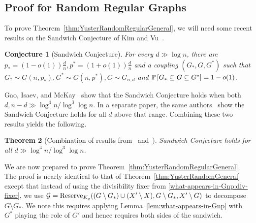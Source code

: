 \documentclass[11pt]{article}
\numberwithin{equation}{section}
\newcounter{i}
\theoremstyle{plain}
\newtheorem{thm}{Theorem}[section]
\newtheorem{conj}[thm]{Conjecture}
\theoremstyle{plain} %
\theoremstyle{definition}
\newcommand{\cG}{\mathcal{G}}
\newcommand{\Prob}[1]{\ensuremath{%
\mathbb P\left[#1\right]
}}
\begin{document}
\subsection{Proof for Random Regular Graphs}

To prove Theorem~\ref{thm:YusterRandomRegularGeneral}, we will need some recent results on the Sandwich Conjecture of Kim and Vu~\cite{KV04}.

\begin{conj}[Sandwich Conjecture]\label{conj:SandwichConj}
For every $d\gg \log n$, there are $p_{*} = (1-o(1))\frac{d}{n}, p^{*} = (1+o(1))\frac{d}{n}$ and a coupling $(G_{*},G,G^{*})$ such that $G_{*} \sim G(n,p_{*}),G^{*} \sim G(n,p^{*}), G\sim G_{n,d}$ and $\Prob{G_{*}\subseteq G\subseteq G^{*} }=1-o(1)$.
\end{conj}

Gao, Isaev, and McKay~\cite{GIM20} show that the Sandwich Conjecture holds when both $d, n-d \gg \log^4 n / \log^3 \log n$. In a separate paper, the same authors~\cite{GIM22} show the Sandwich Conjecture holds for all $d$ above that range. Combining these two results yields the following.

\begin{thm}[Combination of results from~\cite{GIM20} and~\cite{GIM22}]\label{thm:SandwichResult} %
Sandwich Conjecture holds for all $d \gg \log^4 n / \log^3 \log n$.
\end{thm}

We are now prepared to prove Theorem~\ref{thm:YusterRandomRegularGeneral}. The proof is nearly identical to that of Theorem~\ref{thm:YusterRandomGeneral} except that instead of using the divisibility fixer from \ref{what-appears-in-Gnp:div-fixer}, we use $\cG = {\rm Reserve}_{K_q}((G\setminus G_*) \cup (X'\setminus X), G\setminus G_*, X'\setminus G)$ to decompose $G \setminus G_*$. We note this requires applying Lemma~\ref{lem:what-appears-in-Gnp} with $G^*$ playing the role of $G'$ and hence requires both sides of the sandwich.
\end{document}
